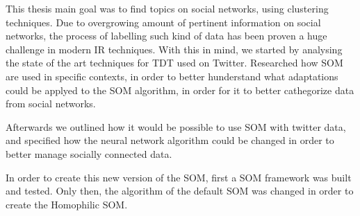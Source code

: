 \label{ch:conclusions}
This thesis main goal was to find topics on social networks, using clustering techniques. Due to overgrowing amount of pertinent information on social networks, the process of labelling such kind of data has been proven a huge challenge in modern \ac{IR} techniques. 
With this in mind, we started by analysing the state of the art techniques for \ac{TDT} used on Twitter. Researched how \ac{SOM} are used in specific contexts, in order to better hunderstand what adaptations could be applyed to the \ac{SOM} algorithm, in order for it to better cathegorize data from social networks.

Afterwards we outlined how it would be possible to use \ac{SOM} with twitter data, and specified how the neural network algorithm could be changed in order to better manage socially connected data. 

In order to create this new version of the \ac{SOM}, first a \ac{SOM} framework was built and tested. Only then, the algorithm of the default \ac{SOM} was changed in order to create the Homophilic SOM.


\cleardoublepage
 
